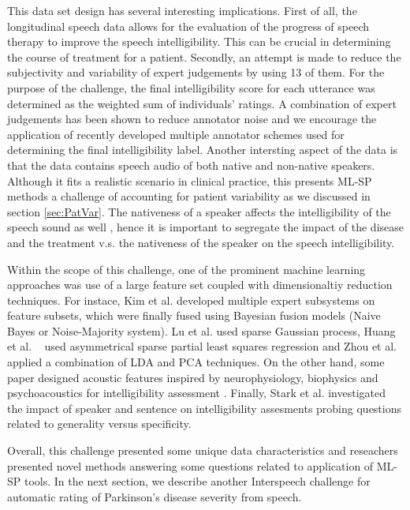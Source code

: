 \documentclass{article}
\begin{document}
This data set design has several interesting implications.
First of all, the longitudinal speech data allows for the evaluation of the progress of speech therapy to improve the speech intelligibility.
This can be crucial in determining the course of treatment for a patient.
Secondly, an attempt is made to reduce the subjectivity and variability of expert judgements by using 13 of them.
For the purpose of the challenge, the final intelligibility score for each utterance was determined as the weighted sum of individuals' ratings.
A combination of expert judgements has been shown to reduce annotator noise \cite{} and we encourage the application of recently developed multiple annotator schemes used for determining the final intelligibility label. 
Another intersting aspect of the data is that the data contains speech audio of both native and non-native speakers. Although it fits a realistic scenario in clinical practice, this presents ML-SP methods a challenge of accounting for patient variability as we discussed in section \ref{sec:PatVar}.
The nativeness of a speaker affects the intelligibility of the speech sound as well \cite{van2001intelligibility}, hence it is important to segregate the impact of the disease and the treatment v.s. the nativeness of the speaker on the speech intelligibility.

Within the scope of this challenge, one of the prominent machine learning approaches was use of a large feature set coupled with dimensionaltiy reduction techniques. 
For instace, Kim et al. \cite{kim2012intelligibility} developed multiple expert subsystems on feature subsets, which were finally fused using Bayesian fusion models (Naive Bayes or Noise-Majority system).
Lu et al. \cite{lu2012predicting} used sparse Gaussian process, Huang et al. ~\cite{huang2012detecting} used asymmetrical sparse partial least squares regression and Zhou et al. \cite{zhou2012automatic} applied a combination of LDA and PCA techniques.
On the other hand, some paper designed acoustic features inspired by neurophysiology, biophysics and psychoacoustics for intelligibility assessment \cite{zhou2012automatic}. 
Finally, Stark et al. \cite{stark2012interspeech} investigated the impact of speaker and sentence on intelligibility assesments probing questions related to generality versus specificity.

Overall, this challenge presented some unique data characteristics and reseachers presented novel methods answering some questions related to application of ML-SP tools.
In the next section, we describe another Interspeech challenge for automatic rating of Parkinson's disease severity from speech. 
\end{document}
